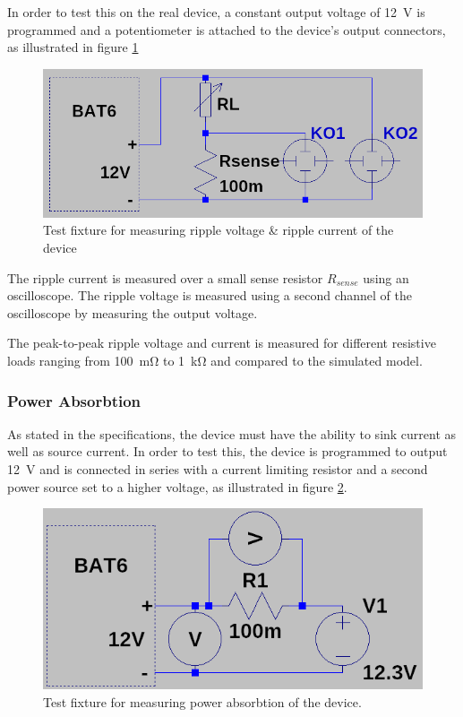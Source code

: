 In  order  to  test this on the  real  device,  a  constant  output  voltage  of
\SI{12}{\volt} is programmed and a potentiometer  is  attached  to  the device's
output connectors, as illustrated in figure \ref{fig:verification:ripple_fix}

\begin{figure}[th!]
    \centering
    \includegraphics[width=.5\textwidth]{images/sim/ripple-fixture.png}
    \caption{Test fixture for measuring ripple voltage \& ripple current of the device}
    \label{fig:verification:ripple_fix}
\end{figure}

The ripple current  is measured over a small sense resistor $R_{sense}$ using an
oscilloscope. The ripple voltage  is  measured  using  a  second  channel of the
oscilloscope by measuring the output voltage.

The peak-to-peak ripple voltage  and current is measured for different resistive
loads ranging from \SI{100}{\milli\ohm} to \SI{1}{\kilo\ohm} and compared to the
simulated model.


\subsubsection{Power Absorbtion}

As stated in the specifications,  the  device  must  have  the  ability  to sink
current  as  well  as  source  current.  In  order to test this, the  device  is
programmed  to  output  \SI{12}{\volt} and is connected in series with a current
limiting resistor  and  a  second  power  source  set  to  a  higher voltage, as
illustrated      in      figure     \ref{fig:verification:power_absorbtion_fix}.

\begin{figure}[th!]
    \centering
    \includegraphics[width=.5\textwidth]{images/sim/power-absorbtion-fixture.png}
    \caption{Test fixture for measuring power absorbtion of the device.}
    \label{fig:verification:power_absorbtion_fix}
\end{figure}

